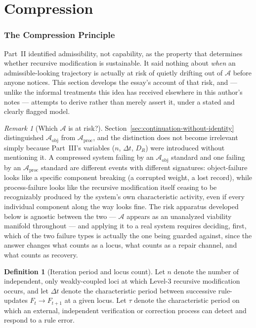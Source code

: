 \documentclass[11pt,a4paper]{article}
\theoremstyle{plain}
\theoremstyle{definition}
\newtheorem{definition}[theorem]{Definition}
\theoremstyle{remark}
\newtheorem{remark}[theorem]{Remark}
\newcommand{\Adm}{\mathcal{A}}
\newcommand{\DR}{D_R}
\begin{document}
\part{Compression}

\section{The Compression Principle}
\label{sec:compression-principle}

Part~II identified admissibility, not capability, as the property that determines whether recursive modification is sustainable. It said nothing about \emph{when} an admissible-looking trajectory is actually at risk of quietly drifting out of $\Adm$ before anyone notices. This section develops the essay's account of that risk, and — unlike the informal treatments this idea has received elsewhere in this author's notes — attempts to derive rather than merely assert it, under a stated and clearly flagged model.

\begin{remark}[Which $\Adm$ is at risk?]
\label{rem:which-adm-at-risk}
Section~\ref{sec:continuation-without-identity} distinguished $\Adm_{\mathrm{obj}}$ from $\Adm_{\mathrm{proc}}$, and the distinction does not become irrelevant simply because Part~III's variables ($n$, $\Delta t$, $\DR$) were introduced without mentioning it. A compressed system failing by an $\Adm_{\mathrm{obj}}$ standard and one failing by an $\Adm_{\mathrm{proc}}$ standard are different events with different signatures: object-failure looks like a specific component breaking (a corrupted weight, a lost record), while process-failure looks like the recursive modification itself ceasing to be recognizably produced by the system's own characteristic activity, even if every individual component along the way looks fine. The risk apparatus developed below is agnostic between the two — $\Adm$ appears as an unanalyzed viability manifold throughout — and applying it to a real system requires deciding, first, which of the two failure types is actually the one being guarded against, since the answer changes what counts as a locus, what counts as a repair channel, and what counts as recovery.
\end{remark}

\begin{definition}[Iteration period and locus count]
\label{def:compression-vars}
Let $n$ denote the number of independent, only weakly-coupled loci at which Level-3 recursive modification occurs, and let $\Delta t$ denote the characteristic period between successive rule-updates $F_t \to F_{t+1}$ at a given locus. Let $\tau$ denote the characteristic period on which an external, independent verification or correction process can detect and respond to a rule error.
\end{definition}
\end{document}
